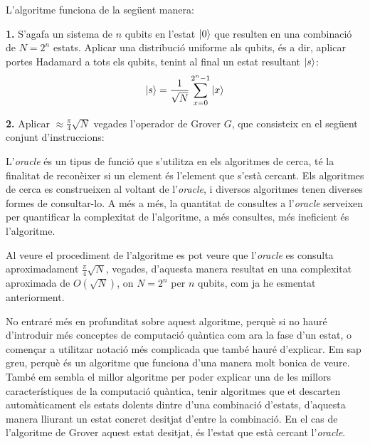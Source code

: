 L'algoritme funciona de la següent manera:

\textbf{1.} S'agafa un sistema de $n$ qubits en l'estat $\ket{0}$ que resulten en una combinació de $N = 2^n$ estats. Aplicar una distribució uniforme als qubits, és a dir, aplicar portes Hadamard a tots els qubits, tenint al final un estat resultant $\ket{s}$:
\begin{equation*}
	\ket{s} = \frac{1}{\sqrt{N}} \sum_{x=0}^{2^n-1} \ket{x}
\end{equation*}
\vspace{2cm}

\textbf{2.} Aplicar $\approx \frac{\pi}{4}\sqrt{N}$ vegades l'operador de Grover $G$, que consisteix en el següent conjunt d'instruccions:
\begin{algorithmic}[1]
\end{algorithmic}


L'\textit{oracle} és un tipus de funció que s'utilitza en els algoritmes de cerca, té la finalitat de reconèixer si un element és l'element que s'està cercant. Els algoritmes de cerca es construeixen al voltant de l'\textit{oracle}, i diversos algoritmes tenen diverses formes de consultar-lo. A més a més, la quantitat de consultes a l'\textit{oracle} serveixen per quantificar la complexitat de l'algoritme, a més consultes, més ineficient és l'algoritme.

Al veure el procediment de l'algoritme es pot veure que l'\textit{oracle} es consulta aproximadament $\frac{\pi}{4}\sqrt{N}$, vegades, d'aquesta manera resultat en una complexitat aproximada de $O(\sqrt{N})$, on $N=2^{n}$ per $n$ qubits, com ja he esmentat anteriorment.

No entraré més en profunditat sobre aquest algoritme, perquè si no hauré d'introduir més conceptes de computació quàntica com ara la fase d'un estat, o començar a utilitzar notació més complicada que també hauré d'explicar. Em sap greu, perquè és un algoritme que funciona d'una manera molt bonica de veure. També em sembla el millor algoritme per poder explicar una de les millors característiques de la computació quàntica, tenir algoritmes que et descarten automàticament els estats dolents dintre d'una combinació d'estats, d'aquesta manera lliurant un estat concret desitjat d'entre la combinació. En el cas de l'algoritme de Grover aquest estat desitjat, és l'estat que està cercant l'\textit{oracle}.

